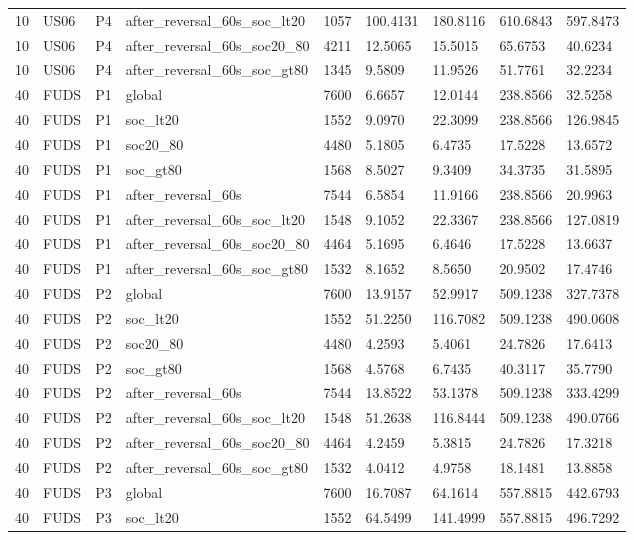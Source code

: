 \begin{tabular}{lllllllll}
10 & US06 & P4 & after\_reversal\_60s\_soc\_lt20 & 1057 & 100.4131 & 180.8116 & 610.6843 & 597.8473 \\
10 & US06 & P4 & after\_reversal\_60s\_soc20\_80 & 4211 & 12.5065 & 15.5015 & 65.6753 & 40.6234 \\
10 & US06 & P4 & after\_reversal\_60s\_soc\_gt80 & 1345 & 9.5809 & 11.9526 & 51.7761 & 32.2234 \\
40 & FUDS & P1 & global & 7600 & 6.6657 & 12.0144 & 238.8566 & 32.5258 \\
40 & FUDS & P1 & soc\_lt20 & 1552 & 9.0970 & 22.3099 & 238.8566 & 126.9845 \\
40 & FUDS & P1 & soc20\_80 & 4480 & 5.1805 & 6.4735 & 17.5228 & 13.6572 \\
40 & FUDS & P1 & soc\_gt80 & 1568 & 8.5027 & 9.3409 & 34.3735 & 31.5895 \\
40 & FUDS & P1 & after\_reversal\_60s & 7544 & 6.5854 & 11.9166 & 238.8566 & 20.9963 \\
40 & FUDS & P1 & after\_reversal\_60s\_soc\_lt20 & 1548 & 9.1052 & 22.3367 & 238.8566 & 127.0819 \\
40 & FUDS & P1 & after\_reversal\_60s\_soc20\_80 & 4464 & 5.1695 & 6.4646 & 17.5228 & 13.6637 \\
40 & FUDS & P1 & after\_reversal\_60s\_soc\_gt80 & 1532 & 8.1652 & 8.5650 & 20.9502 & 17.4746 \\
40 & FUDS & P2 & global & 7600 & 13.9157 & 52.9917 & 509.1238 & 327.7378 \\
40 & FUDS & P2 & soc\_lt20 & 1552 & 51.2250 & 116.7082 & 509.1238 & 490.0608 \\
40 & FUDS & P2 & soc20\_80 & 4480 & 4.2593 & 5.4061 & 24.7826 & 17.6413 \\
40 & FUDS & P2 & soc\_gt80 & 1568 & 4.5768 & 6.7435 & 40.3117 & 35.7790 \\
40 & FUDS & P2 & after\_reversal\_60s & 7544 & 13.8522 & 53.1378 & 509.1238 & 333.4299 \\
40 & FUDS & P2 & after\_reversal\_60s\_soc\_lt20 & 1548 & 51.2638 & 116.8444 & 509.1238 & 490.0766 \\
40 & FUDS & P2 & after\_reversal\_60s\_soc20\_80 & 4464 & 4.2459 & 5.3815 & 24.7826 & 17.3218 \\
40 & FUDS & P2 & after\_reversal\_60s\_soc\_gt80 & 1532 & 4.0412 & 4.9758 & 18.1481 & 13.8858 \\
40 & FUDS & P3 & global & 7600 & 16.7087 & 64.1614 & 557.8815 & 442.6793 \\
40 & FUDS & P3 & soc\_lt20 & 1552 & 64.5499 & 141.4999 & 557.8815 & 496.7292 \\

\end{tabular}
